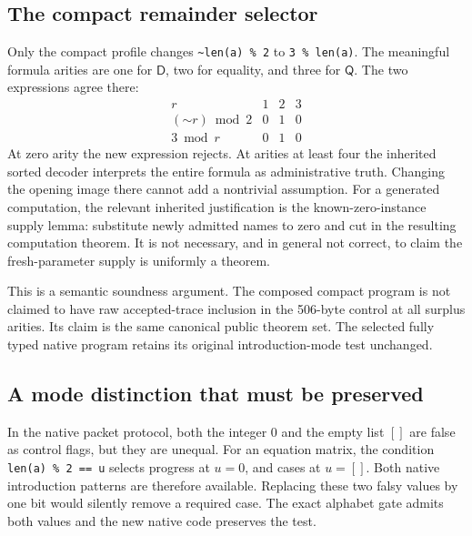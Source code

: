 \documentclass[11pt]{article}
\theoremstyle{definition}\newtheorem{definition}[theorem]{Definition}
\theoremstyle{remark}\newtheorem{remark}[theorem]{Remark}
\newcommand{\D}{\mathsf D}
\newcommand{\Q}{\mathsf Q}
\begin{document}
\subsection{The compact remainder selector}

Only the compact profile changes \lstinline|~len(a) % 2| to
\lstinline|3 % len(a)|. The meaningful formula arities are one for \(\D\),
two for equality, and three for \(\Q\). The two expressions agree there:
\[
\begin{array}{c|ccc}
 r&1&2&3\\\hline
 (\mathord{\sim}r)\bmod2&0&1&0\\
 3\bmod r&0&1&0
\end{array}
\]
At zero arity the new expression rejects. At arities at least four the
inherited sorted decoder interprets the entire formula as administrative
truth. Changing the opening image there cannot add a nontrivial assumption.
For a generated computation, the relevant inherited justification is the
known-zero-instance supply lemma: substitute newly admitted names to zero
and cut in the resulting computation theorem. It is not necessary, and
in general not correct, to claim the fresh-parameter supply is uniformly
a theorem.

This is a semantic soundness argument. The composed compact program is
not claimed to have raw accepted-trace inclusion in the 506-byte control
at all surplus arities. Its claim is the same canonical public theorem
set. The selected fully typed native program retains its original
introduction-mode test unchanged.

\subsection{A mode distinction that must be preserved}

In the native packet protocol, both the integer \(0\) and the empty list
\([]\) are false as control flags, but they are unequal. For an equation
matrix, the condition \lstinline|len(a) % 2 == u| selects progress at
\(u=0\), and cases at \(u=[]\). Both native introduction patterns are
therefore available. Replacing these two falsy values by one bit would
silently remove a required case. The exact alphabet gate admits both
values and the new native code preserves the test.
\end{document}
